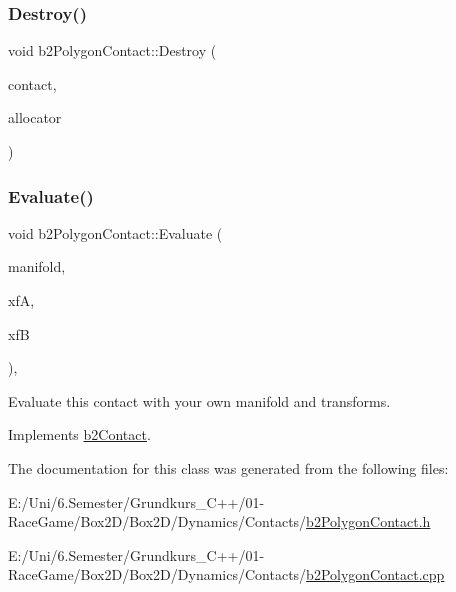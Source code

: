 \mbox{\label{classb2_polygon_contact_a0cb55fd6af6f49d36c3cda15ffd96e63}} 
\subsubsection{\texorpdfstring{Destroy()}{Destroy()}}
{\footnotesize\ttfamily void b2\+Polygon\+Contact\+::\+Destroy (\begin{DoxyParamCaption}\item[{\mbox{\hyperlink{classb2_contact}{b2\+Contact}} $\ast$}]{contact,  }\item[{\mbox{\hyperlink{classb2_block_allocator}{b2\+Block\+Allocator}} $\ast$}]{allocator }\end{DoxyParamCaption})\hspace{0.3cm}{\ttfamily [static]}}

\mbox{\label{classb2_polygon_contact_aa9581ba4a2bc769b80e3f107801d0950}} 
\subsubsection{\texorpdfstring{Evaluate()}{Evaluate()}}
{\footnotesize\ttfamily void b2\+Polygon\+Contact\+::\+Evaluate (\begin{DoxyParamCaption}\item[{\mbox{\hyperlink{structb2_manifold}{b2\+Manifold}} $\ast$}]{manifold,  }\item[{const \mbox{\hyperlink{structb2_transform}{b2\+Transform}} \&}]{xfA,  }\item[{const \mbox{\hyperlink{structb2_transform}{b2\+Transform}} \&}]{xfB }\end{DoxyParamCaption})\hspace{0.3cm}{\ttfamily [override]}, {\ttfamily [virtual]}}



Evaluate this contact with your own manifold and transforms. 



Implements \mbox{\hyperlink{classb2_contact_ae3c2842e5325b2d4500f8ed1d4de2f72}{b2\+Contact}}.



The documentation for this class was generated from the following files\+:\begin{DoxyCompactItemize}
\item 
E\+:/\+Uni/6.\+Semester/\+Grundkurs\+\_\+\+C++/01-\/\+Race\+Game/\+Box2\+D/\+Box2\+D/\+Dynamics/\+Contacts/\mbox{\hyperlink{b2_polygon_contact_8h}{b2\+Polygon\+Contact.\+h}}\item 
E\+:/\+Uni/6.\+Semester/\+Grundkurs\+\_\+\+C++/01-\/\+Race\+Game/\+Box2\+D/\+Box2\+D/\+Dynamics/\+Contacts/\mbox{\hyperlink{b2_polygon_contact_8cpp}{b2\+Polygon\+Contact.\+cpp}}\end{DoxyCompactItemize}

